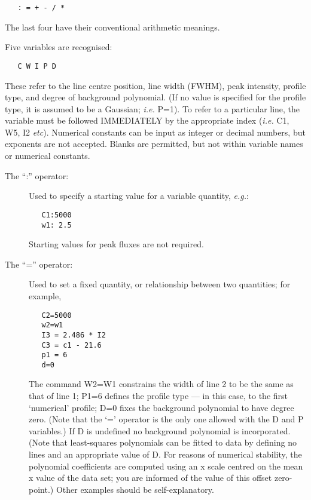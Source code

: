 \begin {description}
\begin{verbatim}
   : = + - / *
\end{verbatim}

The last four have their conventional arithmetic meanings.

Five variables are recognised:

\begin{verbatim}
   C W I P D
\end{verbatim}

These refer to the line centre position, line width (FWHM), peak
intensity, profile type, and degree of background polynomial. (If no
value is specified for the profile type, it is assumed to be a
Gaussian; {\em i.e.} P=1). To refer to a particular line, the variable
must be followed IMMEDIATELY by the appropriate index ({\em i.e.} C1,
W5, I2 {\em etc}). Numerical constants can be input as integer or decimal
numbers, but exponents are not accepted. Blanks are permitted, but not
within variable names or numerical constants.

\begin{description}

\item [The ``:'' operator:]

Used to specify a starting value for a variable quantity, {\em e.g.}:

\begin{verbatim}
   C1:5000
   w1: 2.5
\end{verbatim}

Starting values for peak fluxes are not required.

\item [The ``='' operator:]

Used to set a fixed quantity, or relationship between two quantities; for
example,

\begin{verbatim}
   C2=5000
   w2=w1
   I3 = 2.486 * I2
   C3 = c1 - 21.6
   p1 = 6
   d=0
\end{verbatim}

The command W2=W1 constrains the width of line 2 to be the same as
that of line 1; P1=6 defines the profile type --- in this case, to the
first `numerical' profile; D=0 fixes the background polynomial to have
degree zero. (Note that the `=' operator is the only one allowed with
the D and P variables.) If D is undefined no background polynomial is
incorporated. (Note that least-squares polynomials can be fitted to
data by defining no lines and an appropriate value of D. For reasons
of numerical stability, the polynomial coefficients are computed using
an x scale centred on the mean x value of the data set; you are
informed of the value of this offset zero-point.) Other examples
should be self-explanatory.


\end{description}
\end{description}
